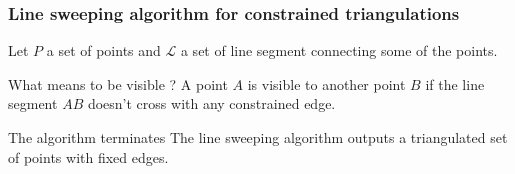 \documentclass[10pt]{beamer}
\begin{document}
\begin{frame}
\frametitle{Line sweeping algorithm for constrained triangulations}
\vspace{.5cm}
Let $P$ a set of points and $\mathcal{L}$ a set of line segment connecting some of the points.
\begin{block}{What means to be visible ?}
	A point $A$ is visible to another point $B$ if the line segment $AB$ doesn't cross with any constrained edge.
\end{block}
\begin{block}{The algorithm terminates}
The line sweeping algorithm outputs a triangulated set of points with fixed edges.
\end{block}	\end{frame}
%
%
\end{document}
